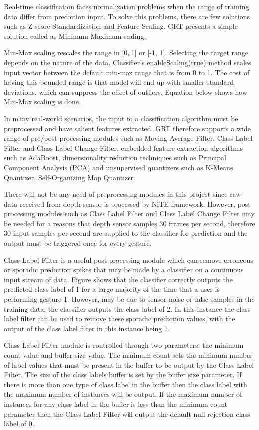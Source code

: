 Real-time classification faces normalization problems when the range of training data differ from prediction input. To solve this problems, there are few solutions such as Z-score Standardization and Feature Scaling. GRT presents a simple solution called as Minimum-Maximum scaling.

Min-Max scaling rescales the range in [0, 1] or [-1, 1]. Selecting the target range depends on the nature of the data. Classifier's enableScaling(true) method scales input vector between the default min-max range that is from 0 to 1. The cost of having this bounded range is that model will end up with smaller standard deviations, which can suppress the effect of outliers. Equation below shows how Min-Max scaling is done.


In many real-world scenarios, the input to a classification algorithm must be preprocessed and have salient features extracted. GRT therefore supports a wide range of pre/post-processing modules such as Moving Average Filter, Class Label Filter and Class Label Change Filter, embedded feature extraction algorithms such as AdaBoost, dimensionality reduction techniques such as Principal Component Analysis (PCA) and unsupervised quantizers such as K-Means Quantizer, Self-Organizing Map Quantizer.

There will not be any need of preprocessing modules in this project since raw data received from depth sensor is processed by NiTE framework. However, post processing modules such as Class Label Filter and Class Label Change Filter may be needed for a reasons that depth sensor samples 30 frames per second, therefore 30 input samples per second are supplied to the classifier for prediction and the output must be triggered once for every gesture. 

Class Label Filter is a useful post-processing module which can remove erroneous or sporadic prediction spikes that may be made by a classifier on a continuous input stream of data. Figure shows that the classifier correctly outputs the predicted class label of 1 for a large majority of the time that a user is performing gesture 1. However, may be due to sensor noise or false samples in the training data, the classifier outputs the class label of 2. In this instance the class label filter can be used to remove these sporadic prediction values, with the output of the class label filter in this instance being 1. 


Class Label Filter module is controlled through two parameters: the minimum count value and buffer size value. The minimum count sets the minimum number of label values that must be present in the buffer to be output by the Class Label Filter. The size of the class labels buffer is set by the buffer size parameter. If there is more than one type of class label in the buffer then the class label with the maximum number of instances will be output. If the maximum number of instances for any class label in the buffer is less than the minimum count parameter then the Class Label Filter will output the default null rejection class label of 0.

